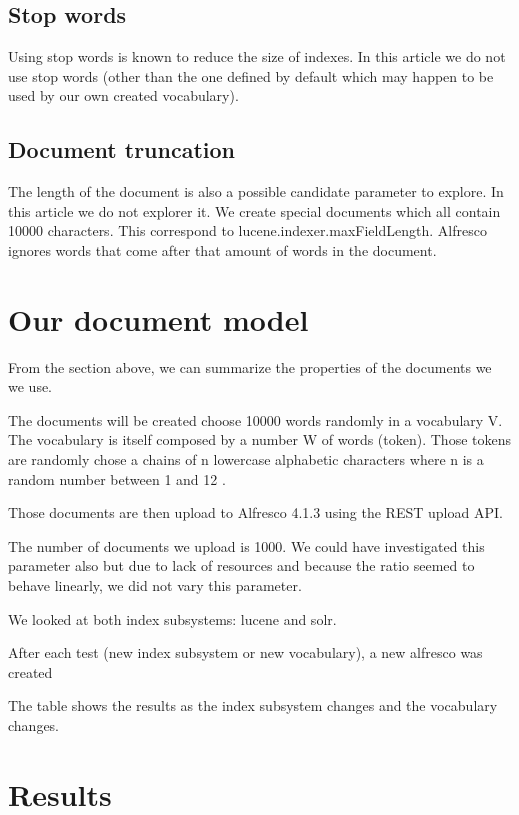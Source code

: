 \documentclass[12pt,a4]{article}
\begin{document}
\subsection{Stop words}
Using stop words is known to reduce the size of indexes.
In this article we do not use stop words (other than the one defined by default which may happen to be used by our own created vocabulary).
 
\subsection{Document truncation}
The length of the document is also a possible candidate parameter to explore. In this article we do not explorer it. We create special documents which all contain 10000 characters. This correspond to lucene.indexer.maxFieldLength. Alfresco ignores words that come after that amount of words in the document.



\section{Our document model}
From the section above, we can summarize the properties of the documents we we use.

The documents will be created choose 10000 words randomly in a vocabulary V.
The vocabulary is itself composed by a number W of words (token). Those tokens are randomly chose a chains of n lowercase alphabetic characters where n is a random number between 1 and 12 .

Those documents are then upload to Alfresco 4.1.3 using the REST upload API.

The number of documents we upload is 1000. We could have investigated this parameter also but due to lack of resources and because the ratio seemed to behave linearly, we did not vary this parameter.

We looked at both index subsystems: lucene and solr.

After each test (new index subsystem or new vocabulary), a new alfresco was created


The table shows the results as the index subsystem changes and the vocabulary changes.

\section{Results}
\end{document}
